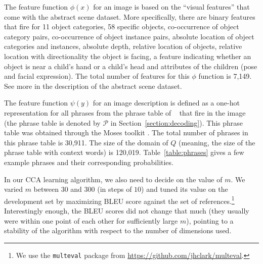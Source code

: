 \documentclass[letterpaper]{article}
\newcommand{\phrasetable}{\mathcal{P}}
\newcommand{\newcite}[1]{\citeauthor{#1}~\shortcite{#1}}
\begin{document}

The feature function $\phi(x)$ for an image is based on the ``visual features'' that come with the abstract scene dataset.
More specifically, there are binary features that fire for 11 object categories, 58 specific objects,
co-occurrence of object category pairs,
co-occurrence of object instance pairs, absolute location of object categories and instances, absolute depth, relative location of objects,
relative location with directionality the object is facing, a feature indicating whether an object is near a child's hand or a child's head and attributes
of the children (pose and facial expression). The total number of features for this $\phi$ function is 7,149. See more in the description of the abstract scene dataset.

The feature function $\psi(y)$ for an image description is defined as a one-hot representation for all phrases from the phrase
table of \newcite{ortiz2015learning} that fire in the image (the phrase table is denoted by $\phrasetable$ in Section~\ref{section:decoding}). This phrase table was obtained through the Moses toolkit \cite{koehn2007moses}.
The total number of phrases in this phrase table is 30,911. The size of the domain of $Q$ (meaning, the size of the phrase table with context words) is 120,019.
Table~\ref{table:phrases} gives a few example phrases and their corresponding probabilities.

In our CCA learning algorithm, we also need to decide on the value of $m$. We varied $m$ between $30$ and $300$ (in steps of $10$) and tuned its value on
the development set by maximizing BLEU score against the set of references.\footnote{We use the {\tt multeval} package from \url{https://github.com/jhclark/multeval}.} Interestingly enough, the BLEU scores did not change that much (they usually were within one point of each other for sufficiently large $m$), pointing to a stability of the algorithm with respect to the number of dimensions used.
\end{document}
